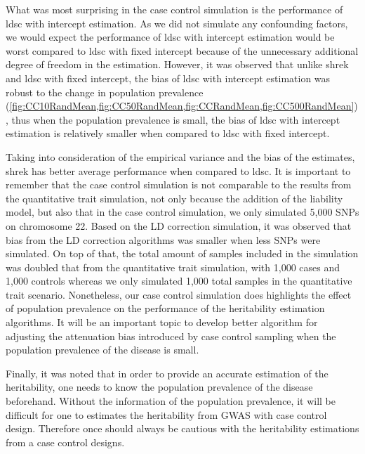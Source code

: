 	What was most surprising in the case control simulation is the performance of \gls{ldsc} with intercept estimation.
	As we did not simulate any confounding factors, we would expect the performance of \gls{ldsc} with intercept estimation would be worst compared to \gls{ldsc} with fixed intercept because of the unnecessary additional degree of freedom in the estimation. 
	However, it was observed that unlike \gls{shrek} and \gls{ldsc} with fixed intercept, the bias of \gls{ldsc} with intercept estimation was robust to the change in population prevalence (\cref{fig:CC10RandMean,fig:CC50RandMean,fig:CCRandMean,fig:CC500RandMean}), thus when the population prevalence is small, the bias of \gls{ldsc} with intercept estimation is relatively smaller when compared to \gls{ldsc} with fixed intercept.

	Taking into consideration of the empirical variance and the bias of the estimates, \gls{shrek} has better average performance when compared to \gls{ldsc}. 
	It is important to remember that the case control simulation is not comparable to the results from the quantitative trait simulation, not only because the addition of the liability model, but also that in the case control simulation, we only simulated 5,000 \glspl{SNP} on chromosome 22.
	Based on the \gls{LD} correction simulation, it was observed that bias from the \gls{LD} correction algorithms was smaller when less \glspl{SNP} were simulated. 
	On top of that, the total amount of samples included in the simulation was doubled that from the quantitative trait simulation, with 1,000 cases and 1,000 controls whereas we only simulated 1,000 total samples in the quantitative trait scenario. 
	Nonetheless, our case control simulation does highlights the effect of population prevalence on the performance of the heritability estimation algorithms.
	It will be an important topic to develop better algorithm for adjusting the attenuation bias introduced by case control sampling when the population prevalence of the disease is small.

	Finally, it was noted that in order to provide an accurate estimation of the heritability, one needs to know the population prevalence of the disease beforehand. 
	Without the information of the population prevalence, it will be difficult for one to estimates the heritability from \gls{GWAS} with case control design. 
	Therefore once should always be cautious with the heritability estimations from a case control designs.
	
